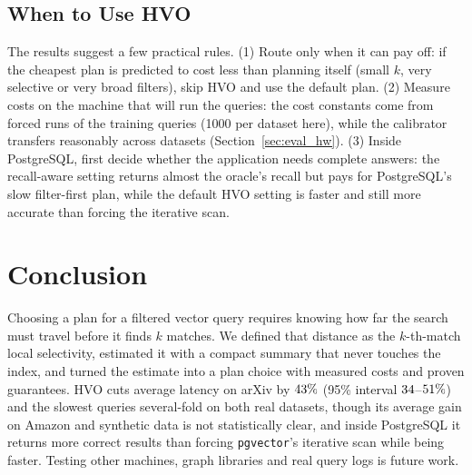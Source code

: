 \documentclass[sigconf, nonacm]{acmart}
\begin{document}
\subsection{When to Use HVO}
The results suggest a few practical rules. (1) Route only when it can pay off: if the cheapest plan is predicted to cost less than planning itself (small $k$, very selective or very broad filters), skip HVO and use the default plan. (2) Measure costs on the machine that will run the queries: the cost constants come from forced runs of the training queries (1000 per dataset here), while the calibrator transfers reasonably across datasets (Section~\ref{sec:eval_hw}). (3) Inside PostgreSQL, first decide whether the application needs complete answers: the recall-aware setting returns almost the oracle's recall but pays for PostgreSQL's slow filter-first plan, while the default HVO setting is faster and still more accurate than forcing the iterative scan.

\section{Conclusion}\label{sec:conclusion}
Choosing a plan for a filtered vector query requires knowing how far the search must travel before it finds $k$ matches. We defined that distance as the $k$-th-match local selectivity, estimated it with a compact summary that never touches the index, and turned the estimate into a plan choice with measured costs and proven guarantees. HVO cuts average latency on arXiv by $43\%$ (95\% interval $34$--$51\%$) and the slowest queries several-fold on both real datasets, though its average gain on Amazon and synthetic data is not statistically clear, and inside PostgreSQL it returns more correct results than forcing \texttt{pgvector}'s iterative scan while being faster. Testing other machines, graph libraries and real query logs is future work.



\end{document}
